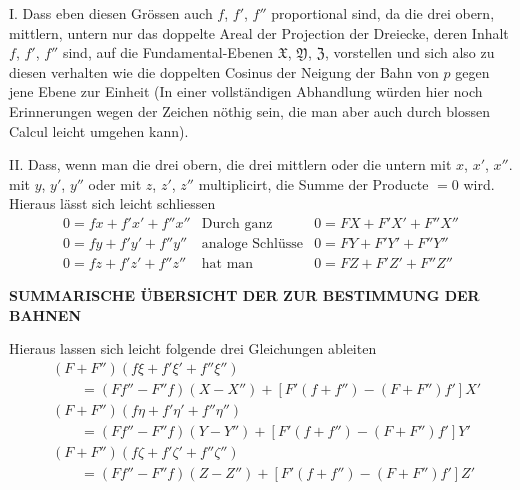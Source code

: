 I. Dass eben diesen Grössen auch $f$, $f'$, $f''$ proportional sind, da die drei obern, mittlern, untern nur das doppelte Areal der Projection der Dreiecke, deren Inhalt $f$, $f'$, $f''$ sind, auf die Fundamental-Ebenen $\mathfrak{X}$, $\mathfrak{Y}$, $\mathfrak{Z}$, vorstellen und sich also zu diesen verhalten wie die doppelten Cosinus der Neigung der Bahn von $p$ gegen jene Ebene zur Einheit (In einer vollständigen Abhandlung würden hier noch Erinnerungen wegen der Zeichen nöthig sein, die man aber auch durch blossen Calcul leicht umgehen kann).

II. Dass, wenn man die drei obern, die drei mittlern oder die untern mit $x$, $x'$, $x''$. mit $y$, $y'$, $y''$ oder mit $z$, $z'$, $z''$ multiplicirt, die Summe der Producte $=0$ wird. Hieraus lässt sich leicht schliessen
\[
\begin{array}{r|c|l}
0=fx+f'x'+f''x''&\text{Durch ganz}&0=FX+F'X'+F''X''\\
0=fy+f'y'+f''y''&\text{analoge Schlüsse}&0=FY+F'Y'+F''Y''\\
0=fz+f'z'+f''z''&\text{hat man}&0=FZ+F'Z'+F''Z''
\end{array}
\]
\clearpage
\endgroup
\clearpage
\begingroup
\pagestyle{empty}
\newcommand{\GaussVIGathering}[2]{%
  \fancypagestyle{gaussVIGathering}{%
    \fancyhf{}%
    \renewcommand{\headrulewidth}{0pt}%
    \renewcommand{\footrulewidth}{0pt}%
    \fancyfoot[C]{\makebox[\textwidth][l]{%
      \hspace*{.025\textwidth}{\footnotesize\bfseries #1}\hfill
      {\normalsize\bfseries #2}\hspace*{.18\textwidth}}}%
  }%
  \thispagestyle{gaussVIGathering}%
}
\thispagestyle{empty}
\noindent{}%
%
\parbox[t]{\dimexpr\linewidth-24mm\relax}{\centering\fontsize{7.4}{9.2}\selectfont\bfseries SUMMARISCHE ÜBERSICHT DER ZUR BESTIMMUNG DER BAHNEN\par}%
\makebox[12mm][r]{}\par\nobreak\medskip
\par\indent Hieraus lassen sich leicht folgende drei Gleichungen ableiten
\[
\begin{aligned}
&(F+F'')(f\xi+f'\xi'+f''\xi'')\\
&\qquad=(Ff''-F''f)(X-X'')+[F'(f+f'')-(F+F'')f']X'\\
&(F+F'')(f\eta+f'\eta'+f''\eta'')\\
&\qquad=(Ff''-F''f)(Y-Y'')+[F'(f+f'')-(F+F'')f']Y'\\
&(F+F'')(f\zeta+f'\zeta'+f''\zeta'')\\
&\qquad=(Ff''-F''f)(Z-Z'')+[F'(f+f'')-(F+F'')f']Z'
\end{aligned}
\]


